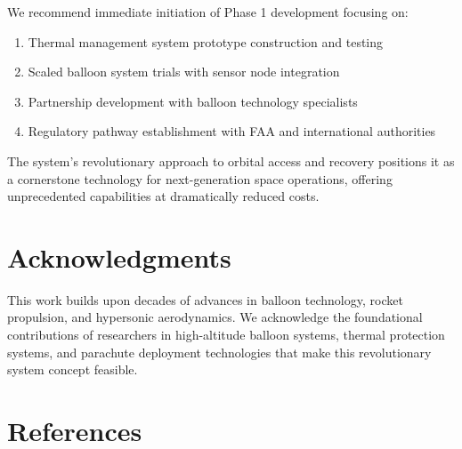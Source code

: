 \documentclass[11pt,a4paper]{article}
\begin{document}
We recommend immediate initiation of Phase 1 development focusing on:
\begin{enumerate}
    \item Thermal management system prototype construction and testing
    \item Scaled balloon system trials with sensor node integration
    \item Partnership development with balloon technology specialists
    \item Regulatory pathway establishment with FAA and international authorities
\end{enumerate}

The system's revolutionary approach to orbital access and recovery positions it as a cornerstone technology for next-generation space operations, offering unprecedented capabilities at dramatically reduced costs.

\section*{Acknowledgments}

This work builds upon decades of advances in balloon technology, rocket propulsion, and hypersonic aerodynamics. We acknowledge the foundational contributions of researchers in high-altitude balloon systems, thermal protection systems, and parachute deployment technologies that make this revolutionary system concept feasible.

\section*{References}
\end{document}
